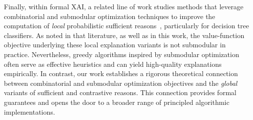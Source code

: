 \documentclass{article}
\begin{document}

Finally, within formal XAI, a related line of work studies methods that leverage combinatorial and submodular optimization techniques to improve the computation of \emph{local} probabilistic sufficient reasons~\citep{bouniausing, bounia2023approximating}, particularly for decision tree classifiers. As noted in that literature, as well as in this work, the value-function objective underlying these local explanation variants is not submodular in practice. Nevertheless, greedy algorithms inspired by submodular optimization often serve as effective heuristics and can yield high-quality explanations empirically. In contrast, our work establishes a rigorous theoretical connection between combinatorial and submodular optimization objectives and the \emph{global} variants of sufficient and contrastive reasons. This connection provides formal guarantees and opens the door to a broader range of principled algorithmic implementations.
\end{document}

